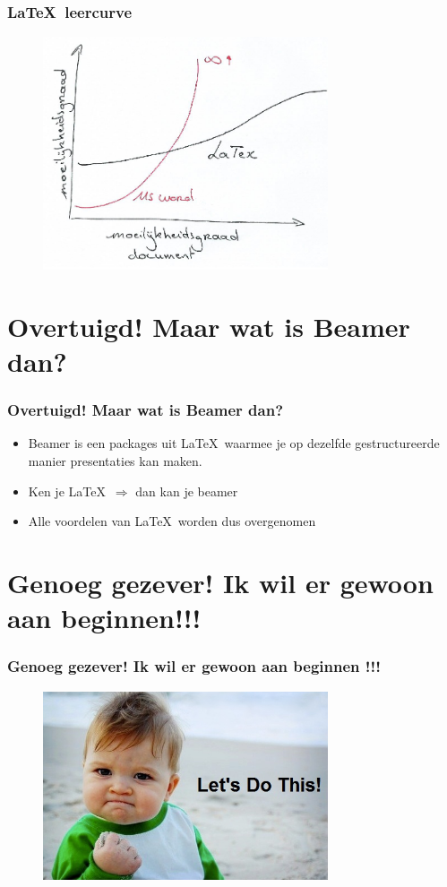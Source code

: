 \documentclass{beamer}
\begin{document}
\begin{frame}
	\frametitle{\LaTeX\ leercurve}
	
	\begin{figure}
		\centering
			\includegraphics[width=0.75\textwidth]{images/learningCurve.png}
		\label{fig:learningCurve}
	\end{figure}
	
\end{frame}
%
\section{Overtuigd! Maar wat is Beamer dan?}

\begin{frame}
	\frametitle{Overtuigd! Maar wat is Beamer dan?}
	
	\begin{itemize}
		\item Beamer is een packages uit \LaTeX\ waarmee je op dezelfde gestructureerde manier presentaties kan maken.
		\pause
		\item Ken je \LaTeX\ $\Rightarrow$ dan kan je beamer
		\pause
		\item Alle voordelen van \LaTeX\ worden dus overgenomen
	\end{itemize}
\end{frame}

\section{Genoeg gezever! Ik wil er gewoon aan beginnen!!!}

\begin{frame}
	\frametitle{Genoeg gezever! Ik wil er gewoon aan beginnen !!!}
	
	
	\begin{figure}
		\centering
			\includegraphics[width=0.75\textwidth]{images/letsDoThis.jpg}
		\label{fig:letsDoThis}
	\end{figure}
	
\end{frame}
\end{document}
